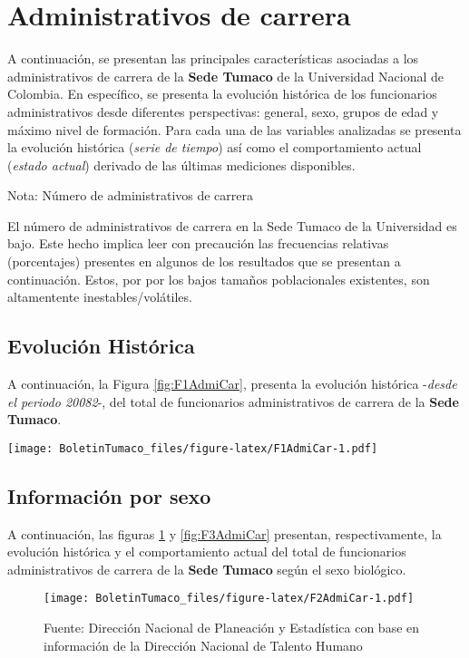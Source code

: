 \documentclass[
]{book}
\begin{document}
\hypertarget{AdmCar}{%
\section{Administrativos de carrera}\label{AdmCar}}

A continuación, se presentan las principales características asociadas a los administrativos de carrera de la \textbf{Sede Tumaco} de la Universidad Nacional de Colombia. En específico, se presenta la evolución histórica de los funcionarios administrativos desde diferentes perspectivas: general, sexo, grupos de edad y máximo nivel de formación. Para cada una de las variables analizadas se presenta la evolución histórica (\emph{serie de tiempo}) así como el comportamiento actual (\emph{estado actual}) derivado de las últimas mediciones disponibles.

Nota: Número de administrativos de carrera

El número de administrativos de carrera en la Sede Tumaco de la Universidad es bajo. Este hecho implica leer con precaución las frecuencias relativas (porcentajes) presentes en algunos de los resultados que se presentan a continuación. Estos, por por los bajos tamaños poblacionales existentes, son altamentente inestables/volátiles.

\hypertarget{evoluciuxf3n-histuxf3rica-5}{%
\subsection{Evolución Histórica}\label{evoluciuxf3n-histuxf3rica-5}}

A continuación, la Figura \ref{fig:F1AdmiCar}, presenta la evolución histórica -\emph{desde el periodo 20082}-, del total de funcionarios administrativos de carrera de la \textbf{Sede Tumaco}.

\texttt{[image: BoletinTumaco\_files/figure-latex/F1AdmiCar-1.pdf]}

\hypertarget{informaciuxf3n-por-sexo-5}{%
\subsection{Información por sexo}\label{informaciuxf3n-por-sexo-5}}

A continuación, las figuras \ref{fig:F2AdmiCar} y \ref{fig:F3AdmiCar} presentan, respectivamente, la evolución histórica y el comportamiento actual del total de funcionarios administrativos de carrera de la \textbf{Sede Tumaco} según el sexo biológico.

\begin{figure}
\centering
\texttt{[image: BoletinTumaco\_files/figure-latex/F2AdmiCar-1.pdf]}
\caption{\label{fig:F2AdmiCar}Fuente: Dirección Nacional de Planeación y Estadística con base en información de la Dirección Nacional de Talento Humano}
\end{figure}
\end{document}
